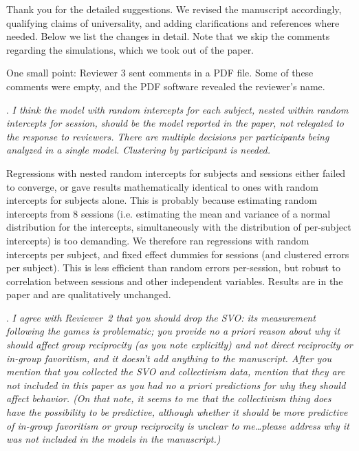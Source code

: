 \documentclass[a4paper,11pt,leqno]{article}
\newcounter{review}
\newcommand{\review}[1]{
\stepcounter{review}
\noindent \arabic{review}.
{\it #1}
\medskip
}
\begin{document}
Thank you for the detailed suggestions. We revised the manuscript accordingly, qualifying claims of universality, and adding clarifications and references where needed.
Below we list the changes in detail. 
Note that we skip the comments regarding the simulations, which we took out of the paper.

One small point: Reviewer 3 sent comments in a PDF file. Some of these comments were empty, and the PDF software revealed the reviewer's name. 


\bigskip

\review{
I think the model with random intercepts for each subject, nested within random intercepts for session, should be the model reported in the paper, not relegated to the response to reviewers. There are multiple decisions per participants being analyzed in a single model. Clustering by participant is needed.
}

Regressions with nested random intercepts for subjects and sessions either failed
to converge, or gave results mathematically identical to ones with random intercepts for subjects 
alone. This is probably because estimating random intercepts from 8 sessions (i.e. estimating the mean
and variance of a normal distribution for the intercepts, simultaneously with the distribution of per-subject intercepts) is too demanding. We therefore
ran regressions with random intercepts per subject, and fixed effect dummies for sessions
(and clustered errors per subject). This is less efficient than random errors per-session, but robust
to correlation between sessions and other independent variables. Results are in the paper and
are qualitatively unchanged.

\bigskip

\review{
I agree with Reviewer~2 that you should drop the SVO: its measurement following the games is problematic; you provide no a priori reason about why it should affect group reciprocity (as you note explicitly) and not direct reciprocity or in-group favoritism, and it doesn't add anything to the manuscript. After you mention that you collected the SVO and collectivism data, mention that they are not included in this paper as you had no a priori predictions for why they should affect behavior. (On that note, it seems to me that the collectivism thing does have the possibility to be predictive, although whether it should be more predictive of in-group favoritism or group reciprocity is unclear to me\ldots please address why it was not included in the models in the manuscript.)
}
\end{document}
